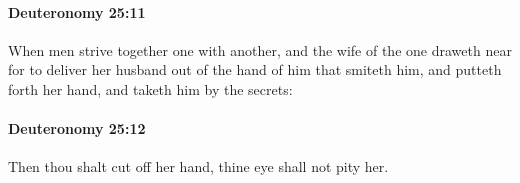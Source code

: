 		\paragraph{Deuteronomy 25:11} %
			\label{DEUTERONOMY-25-11}

			When men strive together one with another, and the wife of the one draweth near for to deliver her husband out of the hand of him that smiteth him, and putteth forth her hand, and taketh him by the secrets:


		\paragraph{Deuteronomy 25:12} %
			\label{DEUTERONOMY-25-12}

			Then thou shalt cut off her hand, thine eye shall not pity her.


